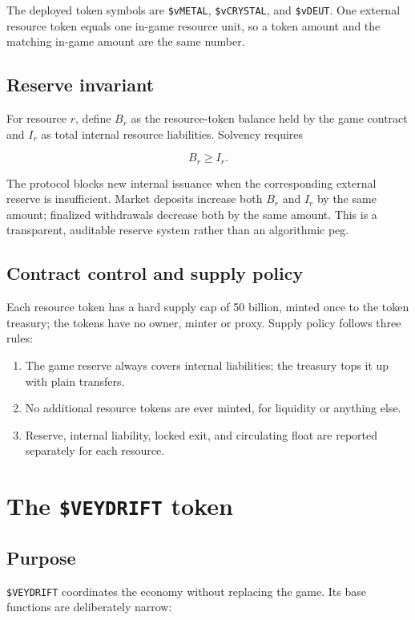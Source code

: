 \documentclass[11pt]{article}
\newcommand{\token}[1]{\texttt{\$#1}}
\begin{document}
The deployed token symbols are \token{vMETAL}, \token{vCRYSTAL}, and \token{vDEUT}. One external resource token equals one in-game resource unit, so a token amount and the matching in-game amount are the same number.

\subsection{Reserve invariant}

For resource $r$, define $B_r$ as the resource-token balance held by the game contract and $I_r$ as total internal resource liabilities. Solvency requires

\[
B_r \ge I_r.
\]

The protocol blocks new internal issuance when the corresponding external reserve is insufficient. Market deposits increase both $B_r$ and $I_r$ by the same amount; finalized withdrawals decrease both by the same amount. This is a transparent, auditable reserve system rather than an algorithmic peg.

\subsection{Contract control and supply policy}

Each resource token has a hard supply cap of 50 billion, minted once to the token treasury; the tokens have no owner, minter or proxy. Supply policy follows three rules:

\begin{enumerate}
  \item The game reserve always covers internal liabilities; the treasury tops it up with plain transfers.
  \item No additional resource tokens are ever minted, for liquidity or anything else.
  \item Reserve, internal liability, locked exit, and circulating float are reported separately for each resource.
\end{enumerate}

\section{The \token{VEYDRIFT} token}

\subsection{Purpose}

\token{VEYDRIFT} coordinates the economy without replacing the game. Its base functions are deliberately narrow:
\end{document}
